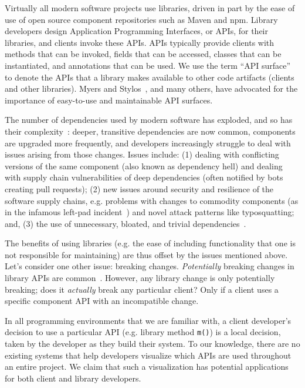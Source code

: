 \label{sec:introduction}

Virtually all modern software projects use libraries, driven in part by the ease of use of open source component repositories such as Maven and npm. Library developers design Application Programming Interfaces, or APIs, for their libraries, and clients invoke these APIs. APIs typically provide clients with methods that can be invoked, fields that can be accessed, classes that can be instantiated, and annotations that can be used. We use the term ``API surface'' to denote the APIs that a library makes available to other code artifacts (clients and other libraries). Myers and Stylos~\cite{myers-cacm-2016}, and many others, have advocated for the importance of easy-to-use and maintainable API surfaces.

The number of dependencies used by modern software has exploded, and so has their complexity~\cite{kikas2017structure,benelallam2019maven}: deeper, transitive dependencies are now common, components are upgraded more frequently, and developers increasingly struggle to deal with issues arising from those changes. Issues include: (1) dealing with conflicting versions of the same component (also known as dependency hell) and dealing with supply chain vulnerabilities of deep dependencies (often notified by bots creating pull requests); (2) new issues around security and resilience of the software supply chains, e.g. problems with changes to commodity components (as in the infamous left-pad incident~\cite{collins16:_how}) and novel attack patterns like typosquatting; and, (3) the use of unnecessary, bloated, and trivial dependencies~\cite{abdalkareem2017developers,soto2021comprehensive}.

The benefits of using libraries (e.g. the ease of including functionality that one is not responsible for maintaining) are thus offset by the issues mentioned above. 
Let's consider one other issue: breaking changes. \textit{Potentially} breaking changes in library APIs are common~\cite{dietrich2014broken,raemaekers2014semantic}. However, any library change is only potentially breaking; does it \textit{actually} break any particular client? Only if a client uses a specific component API with an incompatible change.

In all programming environments that we are familiar with, a client developer's decision to use a particular API (e.g. library method {\tt m()}) is a local decision, taken by the developer as they build their system. To our knowledge, there are no existing systems that help developers visualize which APIs are used throughout an entire project. We claim that such a visualization has potential applications for both client and library developers.

